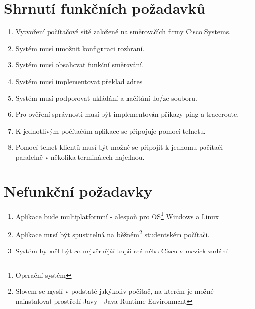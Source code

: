 \section{Shrnutí funkčních požadavků}
\begin{enumerate}
 \item Vytvoření počítačové sítě založené na směrovačích firmy Cisco Systems.
 \item Systém musí umožnit konfiguraci rozhraní.
 \item Systém musí obsahovat funkční směrování.
 \item Systém musí implementovat překlad adres
 \item Systém musí podporovat ukládání a načítání do/ze souboru.
 \item Pro ověření správnosti musí být implementován příkazy ping a traceroute.
 \item K jednotlivým počítačům aplikace se připojuje pomocí telnetu.
 \item Pomocí telnet klientů musí být možné se připojit k jednomu počítači paralelně v několika terminálech najednou.

\end{enumerate}


\section{Nefunkční požadavky}
\begin{enumerate}
 \item Aplikace bude multiplatformní - alespoň pro OS\footnote{Operační systém} Windows a Linux
 \item Aplikace musí být spustitelná na běžném\footnote{Slovem  se myslí v podstatě jakýkoliv počítač, na kterém je možné nainstalovat prostředí Javy - Java Runtime Environment} studentském počítači.
 \item Systém by měl být co nejvěrnější kopií reálného Cisca v mezích zadání.
\end{enumerate}


